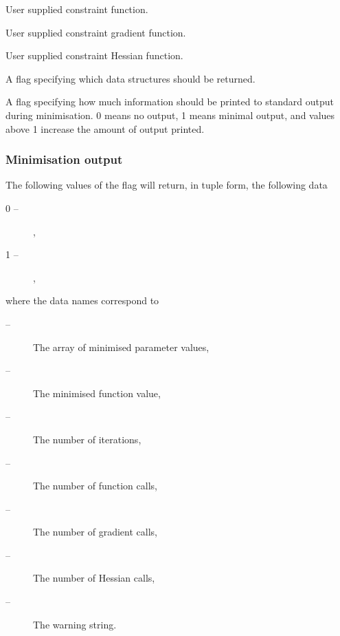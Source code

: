    User supplied constraint function.   

   User supplied constraint gradient function.   

   User supplied constraint Hessian function.   

   A flag specifying which data structures should be returned.   

   A flag specifying how much information should be printed to standard output during minimisation.  0 means no output, 1 means minimal output, and values above 1 increase the amount of output printed.  

  

  
 \subsubsection{Minimisation output} 

 The following values of the  flag will return, in tuple form, the following data 
  

 \begin{description} 
 \item[0 --]  ,  
 \item[1 --]  ,  
 \end{description} 
  

 where the data names correspond to 
  

 \begin{description} 
 \item[ --]      The array of minimised parameter values,  
 \item[ --]      The minimised function value,  
 \item[ --]       The number of iterations,  
 \item[ --] The number of function calls,  
 \item[ --] The number of gradient calls,  
 \item[ --] The number of Hessian calls,  
 \item[ --] The warning string.  
 \end{description} 
  

